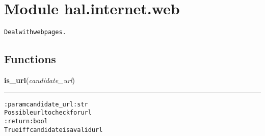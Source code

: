 %
%
%


\section{Module hal.internet.web}

    \label{hal:internet:web}
\begin{alltt}
Deal with webpages. 
\end{alltt}



  \subsection{Functions}

    \label{hal:internet:web:is_url}

    \vspace{0.5ex}

\hspace{.8\funcindent}\begin{boxedminipage}{\funcwidth}

    \raggedright \textbf{is\_url}(\textit{candidate\_url})

    \vspace{-1.5ex}

    \rule{\textwidth}{0.5\fboxrule}
\setlength{\parskip}{2ex}
\begin{alltt}

:param candidate\_url: str
    Possible url to check for url
:return: bool
    True iff candidate is a valid url
\end{alltt}

\setlength{\parskip}{1ex}
    \end{boxedminipage}

